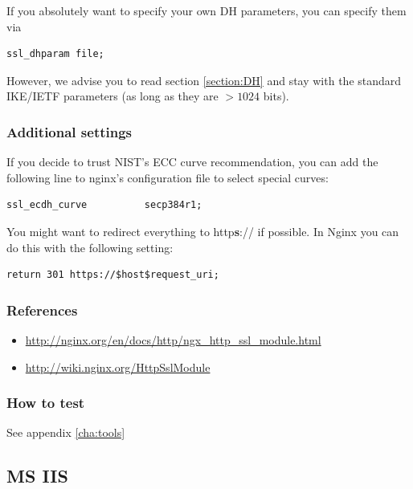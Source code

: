 If you absolutely want to specify your own DH parameters, you can specify them via

\begin{lstlisting}[breaklines]
  ssl_dhparam file;
\end{lstlisting}

However, we advise you to read section \ref{section:DH} and stay with the standard IKE/IETF parameters (as long as they are $ > 1024 $ bits).

\subsubsection{Additional settings}

If you decide to trust NIST's ECC curve recommendation, you can add the following line to nginx's configuration file to select special curves:

\begin{lstlisting}[breaklines]
  ssl_ecdh_curve          secp384r1;
\end{lstlisting}

You might want to redirect everything to http\textbf{s}:// if possible. In Nginx you can do this with the following setting:

\begin{lstlisting}[breaklines]
  return 301 https://$host$request_uri;
\end{lstlisting}


\subsubsection{References} 
\begin{itemize}
\item \url{http://nginx.org/en/docs/http/ngx_http_ssl_module.html}
\item \url{http://wiki.nginx.org/HttpSslModule}
\end{itemize}

\subsubsection{How to test}
See appendix \ref{cha:tools}





\subsection{MS IIS}
\label{sec:ms-iis}


